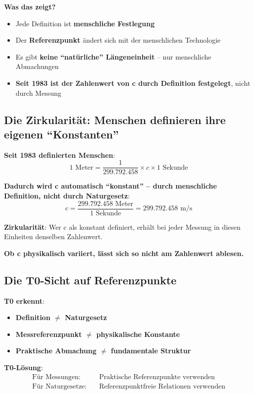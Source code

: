 	\textbf{Was das zeigt?}
	\begin{itemize}
		\item Jede Definition ist \textbf{menschliche Festlegung}
		\item Der \textbf{Referenzpunkt} ändert sich mit der menschlichen Technologie
		\item Es gibt \textbf{keine ``natürliche'' Längeneinheit} – nur menschliche Abmachungen
		\item \textbf{Seit 1983 ist der Zahlenwert von c durch Definition festgelegt}, nicht durch Messung
	\end{itemize}
	
	\subsection{Die Zirkularität: Menschen definieren ihre eigenen ``Konstanten''}
	
	\textbf{Seit 1983 definierten Menschen}:
	\begin{equation}
		1 \text{ Meter} = \frac{1}{299.792.458} \times c \times 1 \text{ Sekunde}
	\end{equation}
	
	\textbf{Dadurch wird c automatisch ``konstant'' – durch menschliche Definition, nicht durch Naturgesetz}:
	\begin{equation}
		c = \frac{299.792.458 \text{ Meter}}{1 \text{ Sekunde}} = 299.792.458 \text{ m/s}
	\end{equation}
	
	\textbf{Zirkularität}: Wer c als konstant definiert, erhält bei jeder Messung in diesen Einheiten denselben Zahlenwert.
	
	\textbf{Ob c physikalisch variiert, lässt sich so nicht am Zahlenwert ablesen.}
	
	\subsection{Die T0-Sicht auf Referenzpunkte}
	
	\textbf{T0 erkennt}:
	\begin{itemize}
		\item \textbf{Definition $\neq$ Naturgesetz}
		\item \textbf{Messreferenzpunkt $\neq$ physikalische Konstante}
		\item \textbf{Praktische Abmachung $\neq$ fundamentale Struktur}
	\end{itemize}
	
	\textbf{T0-Lösung}:
	\begin{align}
		\text{Für Messungen:} \quad &\text{Praktische Referenzpunkte verwenden} \\
		\text{Für Naturgesetze:} \quad &\text{Referenzpunktfreie Relationen verwenden}
	\end{align}
	
